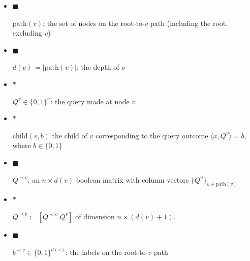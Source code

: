 \documentclass[10pt,a4paper]{article}
\begin{document}
\begin{itemize}


\item[] 
$\blacksquare$ 


$\mathrm{path}(v)$: the set of nodes on the root-to-$v$ path (including the root, excluding $v$)\par





\item[] 
$\blacksquare$ 


$d(v)\coloneqq|\mathrm{path}(v)|$: the depth of $v$\par





\item[] 
$\bm{*}$ 


$Q^{v}\in\{0,1\}^{n}$: the query made at node $v$\par





\item[] 
$\bm{*}$ 


$\mathrm{child}(v,b)$ the child of $v$ corresponding to the query outcome $\langle x,Q^{v}\rangle=b$, where $b\in\{0,1\}$\par





\item[] 
$\blacksquare$ 


$Q^{\prec v}$: an $n\times d(v)$ boolean matrix with column vectors $\{Q^{u}\}_{u\in\mathrm{path}(v)}$\par





\item[] 
$\bm{*}$ 


$Q^{\preceq v}\coloneqq[Q^{\prec v}\;Q^{v}]$ of dimension $n\times(d(v)+1)$.\par





\item[] 
$\blacksquare$ 


$b^{\prec v}\in\{0,1\}^{d(v)}$: the labels on the root-to-$v$ path\par





\end{itemize}
\end{document}

